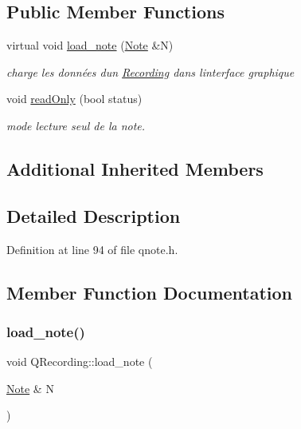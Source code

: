 \subsection*{Public Member Functions}
\begin{DoxyCompactItemize}
\item 
virtual void \hyperlink{class_q_recording_aa6984351b5a0bceaa63be793b160c73b}{load\+\_\+note} (\hyperlink{class_note}{Note} \&N)
\begin{DoxyCompactList}\small\item\em charge les données d\textquotesingle{}un \hyperlink{class_recording}{Recording} dans l\textquotesingle{}interface graphique \end{DoxyCompactList}\item 
void \hyperlink{class_q_recording_a98fa21d8814450c0d912c8ce102ca832}{read\+Only} (bool status)
\begin{DoxyCompactList}\small\item\em mode lecture seul de la note. \end{DoxyCompactList}\end{DoxyCompactItemize}
\subsection*{Additional Inherited Members}


\subsection{Detailed Description}


Definition at line 94 of file qnote.\+h.



\subsection{Member Function Documentation}
\mbox{\label{class_q_recording_aa6984351b5a0bceaa63be793b160c73b}} 
\subsubsection{\texorpdfstring{load\+\_\+note()}{load\_note()}}
{\footnotesize\ttfamily void Q\+Recording\+::load\+\_\+note (\begin{DoxyParamCaption}\item[{\hyperlink{class_note}{Note} \&}]{N }\end{DoxyParamCaption})\hspace{0.3cm}{\ttfamily [virtual]}}




